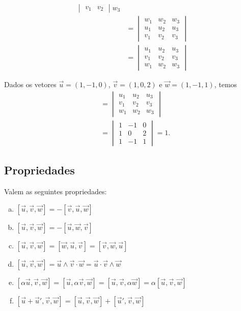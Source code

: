 \begin{align}
\begin{vmatrix}
                                                v_1 & v_2
                                              \end{vmatrix}w_3\\
                            &= \begin{vmatrix}
                                w_1 & w_2 & w_3 \\
                                u_1 & u_2 & u_3 \\
                                v_1 & v_2 & v_3
                              \end{vmatrix} \\
                            &= \begin{vmatrix}
                                u_1 & u_2 & u_3 \\
                                v_1 & v_2 & v_3 \\
                                w_1 & w_2 & w_3 
                              \end{vmatrix}
\end{align}

\begin{ex}
  Dados os vetores $\vec{u} = (1,-1,0)$, $\vec{v} = (1,0,2)$ e $\vec{w} = (1,-1,1)$, temos
  \begin{align}
    [\vec{u},\vec{v},\vec{w}] &=
    \begin{vmatrix}
      u_1 & u_2 & u_3 \\
      v_1 & v_2 & v_3 \\
      w_1 & w_2 & w_3       
    \end{vmatrix} \\
    &=     \begin{vmatrix}
      1 & -1 & 0 \\
      1 & 0  & 2 \\
      1 & -1 & 1       
    \end{vmatrix} = 1.
  \end{align}
\end{ex}

\subsection{Propriedades}

Valem as seguintes propriedades:
\begin{enumerate}[a)]
\item $[\vec{u},\vec{v},\vec{w}] = -[\vec{v},\vec{u},\vec{w}]$
\item $[\vec{u},\vec{v},\vec{w}] = -[\vec{u},\vec{w},\vec{v}]$
\item $[\vec{u},\vec{v},\vec{w}] = [\vec{w},\vec{u},\vec{v}] = [\vec{v},\vec{w},\vec{u}]$
\item $[\vec{u},\vec{v},\vec{w}] = \vec{u}\land\vec{v}\cdot\vec{w} = \vec{u}\cdot\vec{v}\land\vec{w}$
\item $[\alpha\vec{u},\vec{v},\vec{w}] = [\vec{u},\alpha\vec{v},\vec{w}]=[\vec{u},\vec{v},\alpha\vec{w}] = \alpha[\vec{u},\vec{v},\vec{w}]$
\item $[\vec{u}+\vec{u}',\vec{v},\vec{w}] = [\vec{u},\vec{v},\vec{w}]+[\vec{u}',\vec{v},\vec{w}]$
\end{enumerate}

